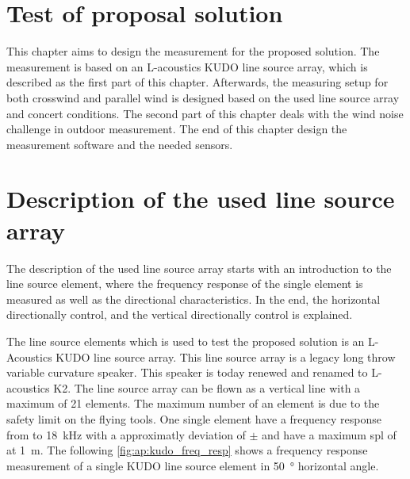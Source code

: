 \section{Test of proposal solution}
This chapter aims to design the measurement for the proposed solution. The measurement is based on an L-acoustics KUDO line source array, which is described as the first part of this chapter. Afterwards, the measuring setup for both crosswind and parallel wind is designed based on the used line source array and concert conditions. The second part of this chapter deals with the wind noise challenge in outdoor measurement. The end of this chapter design the measurement software and the needed sensors. 



\section{Description of the used line source array}\label{sec:prop:des_of_lin}

The description of the used line source array starts with an introduction to the line source element, where the frequency response of the single element is measured as well as the directional characteristics. In the end, the horizontal directionally control, and the vertical directionally control is explained.

The line source elements which is used to test the proposed solution is an L-Acoustics KUDO line source array. This line source array is a legacy long throw variable curvature speaker. This speaker is today renewed and renamed to L-acoustics K2. The line source array can be flown as a vertical line with a maximum of 21 elements. The maximum number of an element is due to the safety limit on the flying tools. 
One single element have a frequency response from  to \SI{18}{\kilo\hertz} with a approximatly deviation of $\pm$  and have a maximum \gls{spl} of  at \SI{1}{\meter}. The following \autoref{fig:ap:kudo_freq_resp} shows a frequency response measurement of a single KUDO line source element in \SI{50}{\degree} horizontal angle. 


